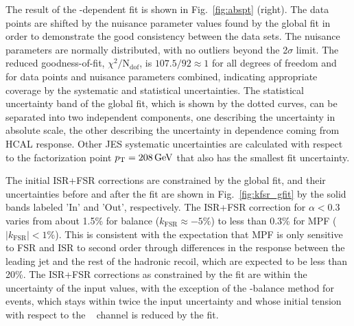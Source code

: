 \documentclass[11pt,twoside,a4paper,cmspaper,final,collab]{cms-tdr}
\begin{document}
The result of the \pt-dependent fit is shown in Fig.~\ref{fig:abspt} (right). The data points are shifted by the nuisance parameter values found by the global fit in order to demonstrate the good consistency between the data sets. The nuisance parameters are normally distributed, with no outliers beyond the 2$\sigma$ limit. The reduced goodness-of-fit, $\chi^2 / \mathrm{N_\mathrm{dof}}$, is $107.5/92\approx1$ for all degrees of freedom and for data points and nuisance parameters combined, indicating appropriate coverage by the systematic and statistical uncertainties. The statistical uncertainty band of the global fit, which is shown by the dotted curves, can be separated into two independent components, one describing the uncertainty in absolute scale, the other describing the uncertainty in \pt dependence coming from HCAL response. Other JES systematic uncertainties are calculated with respect to the factorization point $p_{\mathrm{T}}=208\,\text{Ge\hspace{-.08em}V}$ that also has the smallest fit uncertainty.

The initial ISR+FSR corrections are constrained by the global fit, and their uncertainties before and after the fit are shown in Fig.~\ref{fig:kfsr_gfit} by the solid bands labeled 'In' and 'Out', respectively.
The ISR+FSR correction for $\alpha<0.3$ varies from about 1.5\% for \pt balance ($k_\mathrm{FSR}\approx -5\%$) to less than 0.3\% for MPF ($|k_\mathrm{FSR}|<1\%$). This is consistent with the expectation that MPF is only sensitive to FSR and ISR to second order through differences in the response between the leading jet and the rest of the hadronic recoil, which are expected to be less than 20\%.  The ISR+FSR corrections as constrained by the fit are within the uncertainty of the input values, with the exception of the \pt-balance method for \zmmjet~ events, which stays within twice the input uncertainty and whose initial tension with respect to the \zeejet~ channel is reduced by the fit.
\end{document}
